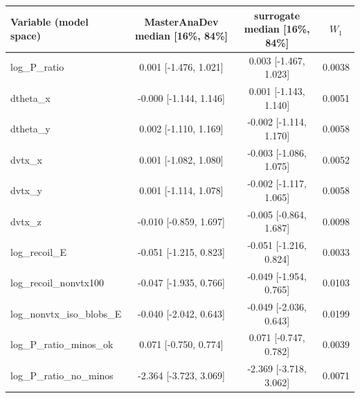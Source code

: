 \begin{tabular}{lccc}
\toprule
Variable (model space) & MasterAnaDev median [16\%, 84\%] & surrogate median [16\%, 84\%] & $W_1$ \\
\midrule
log\_P\_ratio & 0.001 [-1.476, 1.021] & 0.003 [-1.467, 1.023] & 0.0038 \\
dtheta\_x & -0.000 [-1.144, 1.146] & 0.001 [-1.143, 1.140] & 0.0051 \\
dtheta\_y & 0.002 [-1.110, 1.169] & -0.002 [-1.114, 1.170] & 0.0058 \\
dvtx\_x & 0.001 [-1.082, 1.080] & -0.003 [-1.086, 1.075] & 0.0052 \\
dvtx\_y & 0.001 [-1.114, 1.078] & -0.002 [-1.117, 1.065] & 0.0058 \\
dvtx\_z & -0.010 [-0.859, 1.697] & -0.005 [-0.864, 1.687] & 0.0098 \\
log\_recoil\_E & -0.051 [-1.215, 0.823] & -0.051 [-1.216, 0.824] & 0.0033 \\
log\_recoil\_nonvtx100 & -0.047 [-1.935, 0.766] & -0.049 [-1.954, 0.765] & 0.0103 \\
log\_nonvtx\_iso\_blobs\_E & -0.040 [-2.042, 0.643] & -0.049 [-2.036, 0.643] & 0.0199 \\
log\_P\_ratio\_minos\_ok & 0.071 [-0.750, 0.774] & 0.071 [-0.747, 0.782] & 0.0039 \\
log\_P\_ratio\_no\_minos & -2.364 [-3.723, 3.069] & -2.369 [-3.718, 3.062] & 0.0071 \\
\bottomrule
\end{tabular}
